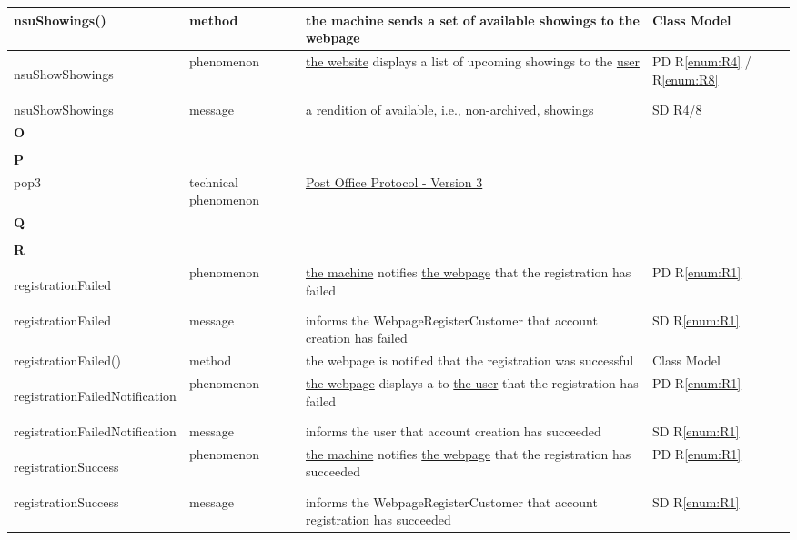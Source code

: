 \documentclass[a4paper,10pt,titlepage,bibtotoc,bibtotocnumbered]{scrreprt}
\begin{document}
\begin{longtable}{|p{4.75cm}|p{3cm}|p{5cm}|l|}
\hline
nsuShowings() & method & the machine sends a set of available showings to the webpage & Class Model\\
\hline
\hypertarget{glossary:nsuShowShowings}{nsuShowShowings} & phenomenon & \hyperlink{glossary:WebPageNonStaffUserBrowse}{the website} displays a list of upcoming showings to the \hyperlink{glossary:NonStaffUser}{user} & PD R\ref{enum:R4} / R\ref{enum:R8}\\
\hline
nsuShowShowings & message & a rendition of available, i.e., non-archived, showings & SD R4/8\\
\hline
\multicolumn{4}{|l|}{\textbf{O}}\\
\hline
&  &  & \\
\hline
\multicolumn{4}{|l|}{\textbf{P}}\\
\hline
pop3 & technical phenomenon & \hyperlink{tools.ietf.org/html/rfc1939}{Post Office Protocol - Version 3} & \\
\hline
\multicolumn{4}{|l|}{\textbf{Q}}\\
\hline
&  &  & \\
\hline
\multicolumn{4}{|l|}{\textbf{R}}\\
\hline
\hypertarget{glossary:registrationFailed}{registrationFailed} & phenomenon & \hyperlink{glossary:UDEKino}{the machine} notifies \hyperlink{glossary:WebpageRegisterCustomer}{the webpage} that the registration has failed & PD R\ref{enum:R1}\\
\hline
registrationFailed & message & informs the WebpageRegisterCustomer that account creation has failed & SD R\ref{enum:R1}\\
\hline
registrationFailed() & method & the webpage is notified that the registration was successful & Class Model\\
\hline
\hypertarget{glossary:registrationFailedNotification}{registrationFailedNotification} & phenomenon & \hyperlink{glossary:WebpageRegisterCustomer}{the webpage} displays a to \hyperlink{glossary:User}{the user} that the registration has failed & PD R\ref{enum:R1}\\
\hline
registrationFailedNotification & message & informs the user that account creation has succeeded & SD R\ref{enum:R1}\\
\hline
\hypertarget{glossary:registrationSuccess}{registrationSuccess} & phenomenon & \hyperlink{glossary:UDEKino}{the machine} notifies \hyperlink{glossary:WebpageRegisterCustomer}{the webpage} that the registration has succeeded & PD R\ref{enum:R1}\\
\hline
registrationSuccess & message & informs the WebpageRegisterCustomer that account registration has succeeded & SD R\ref{enum:R1}\\

\end{longtable}
\end{document}
